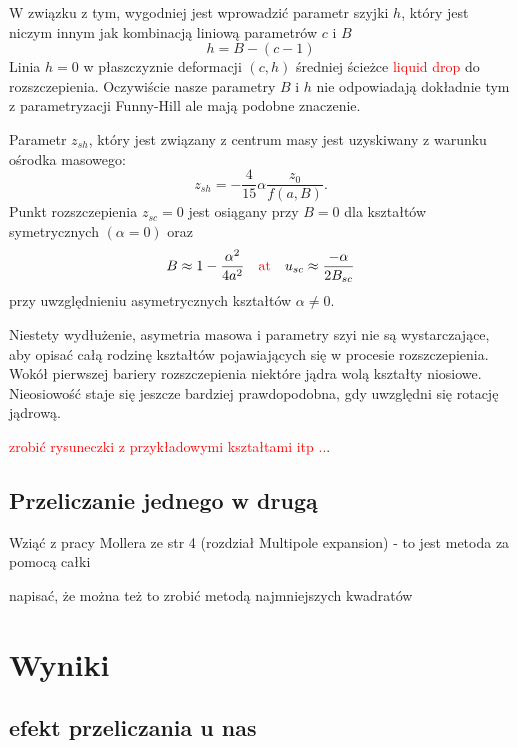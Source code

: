 \documentclass[polish]{article}
\numberwithin{equation}{section}
\begin{document}
W związku z tym, wygodniej jest wprowadzić parametr szyjki $h$, który jest niczym innym jak kombinacją liniową parametrów $c$ i $B$
\begin{equation}
h=B-(c-1)
\end{equation}
Linia $h=0$ w płaszczyznie deformacji $(c,h)$ średniej ścieżce \textcolor{red}{liquid drop} do 	rozszczepienia. Oczywiście nasze parametry $B$ i $h$ nie odpowiadają dokładnie tym z parametryzacji Funny-Hill ale mają podobne znaczenie.

Parametr $z_{sh}$, który jest związany z centrum masy jest uzyskiwany z warunku ośrodka masowego:
\begin{equation}
z_{sh}=-\frac{4}{15}\alpha \frac{z_{0}}{f(a,B)}.
\end{equation}
Punkt rozszczepienia $z_{sc}=0$ jest osiągany przy $B=0$ dla kształtów symetrycznych $(\alpha=0)$ oraz
\begin{equation}
B\approx 1-\frac{\alpha^{2}}{4a^{2}} \quad \textcolor{red}{\textrm{at}} \quad u_{sc}\approx \frac{-\alpha}{2B_{sc}}
\end{equation}
przy uwzględnieniu asymetrycznych kształtów $\alpha\neq 0$.

Niestety wydłużenie, asymetria masowa i parametry szyi nie są wystarczające, aby opisać całą rodzinę kształtów pojawiających się w procesie rozszczepienia. Wokół pierwszej bariery rozszczepienia niektóre jądra wolą kształty niosiowe. Nieosiowość staje się jeszcze bardziej prawdopodobna, gdy uwzględni się rotację jądrową.

\bigskip
\textcolor{red}{zrobić rysuneczki z przykładowymi kształtami itp ..}.

\subsection{Przeliczanie jednego w drugą}

Wziąć z pracy Mollera ze str 4 (rozdział Multipole expansion) - to jest metoda za pomocą całki

napisać, że można też to zrobić metodą najmniejszych kwadratów

\section{Wyniki}

\subsection{efekt przeliczania u nas}
\end{document}

